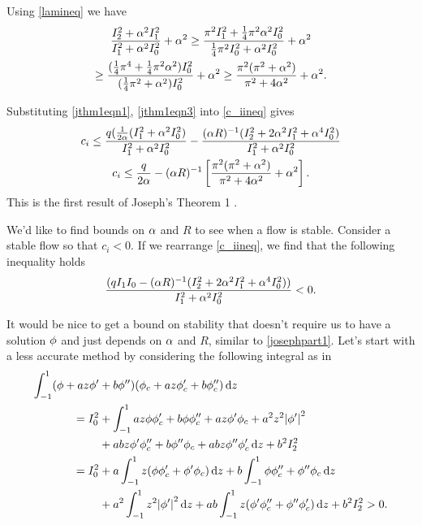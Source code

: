 Using \eqref{lamineq} we have
\begin{gather}
    \frac{I^2_{2} + \alpha^2 I^2_{1}}{I^2_{1} + \alpha^2 I^2_{0}} + \alpha^2 \geq \frac{\pi^2 I^2_{1} + \tfrac{1}{4} \pi^2 \alpha^2 I^2_{0}}{\tfrac{1}{4} \pi^2 I^2_{0} + \alpha^2 I^2_{0}} + \alpha^2 \nonumber\\
    \geq \frac{(\tfrac{1}{4} \pi^4 + \tfrac{1}{4} \pi^2 \alpha^2) I^2_{0}}{(\tfrac{1}{4} \pi^2 + \alpha^2) I^2_{0}} + \alpha^2 \geq \frac{\pi^2 (\pi^2 + \alpha^2)}{\pi^2 + 4 \alpha^2} + \alpha^2.
    \label{jthm1eqn3}
\end{gather}

Substituting \eqref{jthm1eqn1}, \eqref{jthm1eqn3} into \eqref{c_iineq} gives
\begin{gather}
    c_i \leq \frac{q ( \tfrac{1}{2 \alpha} (I^2_{1} + \alpha^2 I^2_{0})}{I^2_{1} + \alpha^2 I^2_{0}} - \frac{(\alpha R)^{-1} (I^2_{2} + 2 \alpha^2 I^2_{1} + \alpha^4 I^2_{0})}{I^2_{1} + \alpha^2 I^2_{0}} \nonumber\\
    c_i \leq \frac{q}{2 \alpha } - (\alpha R)^{-1} \left[\frac{\pi^2 (\pi^2 + \alpha^2)}{\pi^2 + 4 \alpha^2} + \alpha^2\right]. \label{josephpart1}
\end{gather}
This is the first result of Joseph's Theorem 1 \citep{joseph1969eigenvalue}.

We'd like to find bounds on $ \alpha $ and $ R $ to see when a flow is stable. Consider a stable flow so that $ c_i < 0 $. If we rearrange \eqref{c_iineq}, we find that the following inequality holds
\begin{equation}
    \frac{(q I_1 I_0 - (\alpha R)^{-1} (I^2_{2} + 2 \alpha^2 I^2_{1} + \alpha^4 I^2_{0}))}{I^2_{1} + \alpha^2 I^2_{0}} < 0.
\label{stabineq}
\end{equation}

It would be nice to get a bound on stability that doesn't require us to have a solution $ \phi$ and just depends on $\alpha $ and $R$, similar to \eqref{josephpart1}. Let's start with a less accurate method by considering the following integral as in \citet{synge1938hydrodynamical}
\begin{align}
    \int^{1}_{-1} (\phi + a z \phi' &+ b \phi'')(\phi_c + a z \phi_c' + b \phi''_c) \dd{z} \nonumber\\
    = I^2_{0} &+ \int^{1}_{-1} a z \phi \phi_c' + b \phi \phi''_c + a z \phi' \phi_c + a^2 z^2 \abs{\phi'}^2 \nonumber\\ &+ a b z \phi' \phi''_c + b \phi'' \phi_c + a b z \phi'' \phi'_c \dd{z} + b^2 I^2_{2} \nonumber\\
    = I^2_{0} &+ a \int^{1}_{-1} z (\phi \phi'_c + \phi' \phi_c) \dd{z} + b \int^{1}_{-1} \phi \phi''_c + \phi'' \phi_c \dd{z} \nonumber\\
    &+ a^2 \int^{1}_{-1} z^2 \abs{\phi'}^2 \dd{z} + ab \int^{1}_{-1} z (\phi' \phi''_c + \phi'' \phi'_c) \dd{z} + b^2 I^2_{2} > 0.
    \label{phiresult}
\end{align}

